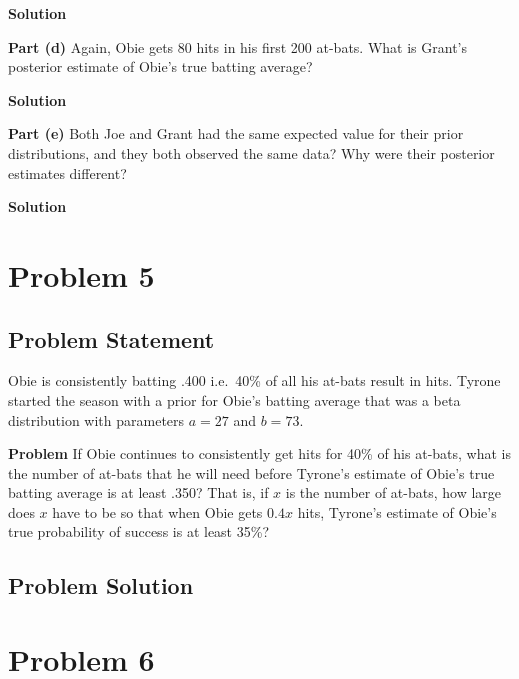 \documentclass[12pt]{article}
\theoremstyle{definition}
\begin{document}
\bigskip
\noindent
{\bf Solution} 



\vspace{1.5in}
\noindent
{\bf Part (d)} Again, Obie gets 80 hits in his first 200 at-bats. What is Grant's posterior estimate of Obie's true batting average?

\bigskip
\noindent
{\bf Solution} 



\vspace{1.5in}
\noindent
{\bf Part (e)} Both Joe and Grant had the same expected value for their prior distributions, and they both observed the same data? Why were their posterior estimates different?

\bigskip
\noindent
{\bf Solution} 







\newpage
\section*{Problem 5}

\subsection*{Problem Statement}

Obie is consistently batting .400 i.e.\ 40\% of all his at-bats result in hits. Tyrone started the season with a prior for Obie's batting average that was a beta distribution with parameters $a = 27$ and $b = 73$.

\bigskip
\noindent
{\bf Problem} If Obie continues to consistently get hits for 40\% of his at-bats, what is the number of at-bats that he will need before Tyrone's estimate of Obie's true batting average is at least .350? That is, if $x$ is the number of at-bats, how large does $x$ have to be so that when Obie gets $0.4x$ hits, Tyrone's estimate of Obie's true probability of success is at least 35\%?


\subsection*{Problem Solution}




\newpage
\section*{Problem 6}
\end{document}
